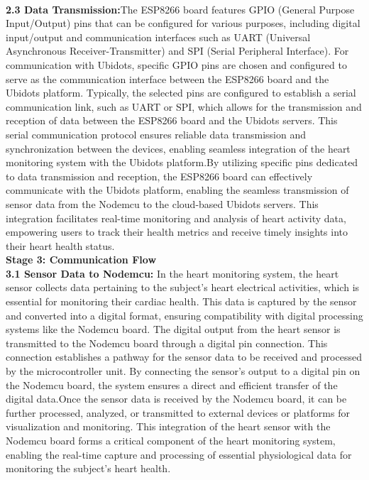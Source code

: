 \\
\textbf{2.3 Data Transmission:}The ESP8266 board features GPIO (General Purpose Input/Output) pins that can be configured for various purposes, including digital input/output and communication interfaces such as UART (Universal Asynchronous Receiver-Transmitter) and SPI (Serial Peripheral Interface). For communication with Ubidots, specific GPIO pins are chosen and configured to serve as the communication interface between the ESP8266 board and the Ubidots platform.
Typically, the selected pins are configured to establish a  serial communication link, such as UART or SPI, which allows for the transmission and reception of data between the ESP8266 board and the Ubidots servers. This serial communication protocol ensures reliable data transmission and synchronization between the devices, enabling seamless integration of the heart monitoring system with the Ubidots platform.By utilizing specific pins dedicated to data transmission and reception, the ESP8266\cite{hu2020internet} board can effectively communicate with the Ubidots platform, enabling the seamless transmission of sensor data from the Nodemcu to the cloud-based Ubidots servers. This integration facilitates real-time monitoring and analysis of heart activity data, empowering users to track their health metrics and receive timely insights into their heart health status.
\\
\textbf{{Stage 3: Communication Flow}}
\\
\textbf{3.1 Sensor Data to Nodemcu:} 
In the heart monitoring system, the heart sensor collects data pertaining to the subject's heart electrical activities, which is essential for monitoring their cardiac health. This data is captured by the sensor and converted into a digital format, ensuring compatibility with digital processing systems like the Nodemcu board.
The digital output from the heart sensor is transmitted to the Nodemcu board through a digital pin connection. This connection establishes a pathway for the sensor data to be received and processed by the microcontroller unit. By connecting the sensor's output to a digital pin on the Nodemcu board, the system ensures a direct and efficient transfer of the digital data.Once the sensor data is received by the Nodemcu board, it can be further processed, analyzed, or transmitted to external devices or platforms for visualization and monitoring. This integration of the heart sensor with the Nodemcu board forms a critical component of the heart monitoring system, enabling the real-time capture and processing of essential physiological data for monitoring the subject's heart health.
